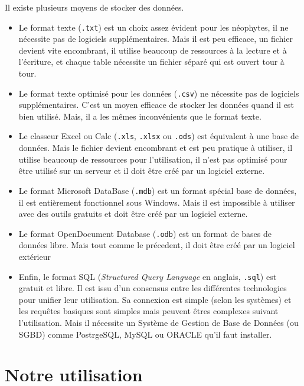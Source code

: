 Il existe plusieurs moyens de stocker des données.
\begin{itemize}
	\item Le format texte (\verb-.txt-) est un choix assez évident pour les néophytes, il ne nécessite pas de logiciels supplémentaires. Mais il est peu efficace, un fichier devient vite encombrant, il utilise beaucoup de ressources à la lecture et à l'écriture, et chaque table nécessite un fichier séparé qui est ouvert tour à tour.
	
	\item Le format texte optimisé pour les données (\verb-.csv-) ne nécessite pas de logiciels supplémentaires. C'est un moyen efficace de stocker les données quand il est bien utilisé. Mais, il a les mêmes inconvénients que le format texte.
	
	\item Le classeur Excel ou Calc (\verb-.xls-, \verb-.xlsx- ou \verb-.ods-) est équivalent à une base de données. Mais le fichier devient encombrant et est peu pratique à utiliser, il utilise beaucoup de ressources pour l'utilisation, il n'est pas optimisé pour être utilisé sur un serveur et il doit être créé par un logiciel externe.
	
	\item Le format Microsoft DataBase (\verb-.mdb-) est un format spécial base de données, il est entièrement fonctionnel sous Windows. Mais il est impossible à utiliser avec des outils gratuits et doit être créé par un logiciel externe.
	
	\item Le format OpenDocument Database (\verb-.odb-) est un format de bases de données libre. Mais tout comme le précedent, il doit être créé par un logiciel extérieur
	
	\item Enfin, le format SQL (\emph{Structured Query Language} en anglais, \verb-.sql-) est gratuit et libre. Il est issu d'un consensus entre les différentes technologies pour unifier leur utilisation. Sa connexion est simple (selon les systèmes) et les requêtes basiques sont simples mais peuvent êtres complexes suivant l'utilisation. Mais il nécessite un Système de Gestion de Base de Données (ou SGBD) comme PostrgeSQL, MySQL ou ORACLE qu'il faut installer.
\end{itemize}

\section{Notre utilisation}

